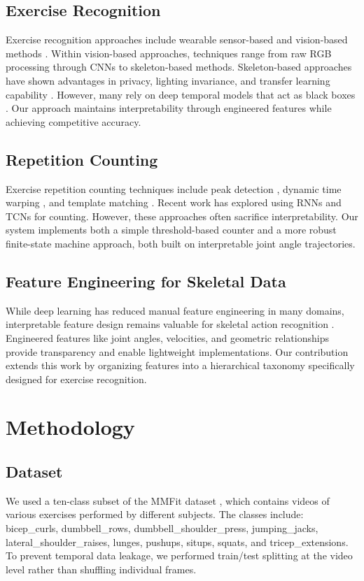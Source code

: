 \documentclass[conference]{IEEEtran}
\begin{document}
\subsection{Exercise Recognition}
Exercise recognition approaches include wearable sensor-based \cite{wearable_rec} and vision-based methods \cite{vision_rec}. Within vision-based approaches, techniques range from raw RGB processing through CNNs to skeleton-based methods. Skeleton-based approaches have shown advantages in privacy, lighting invariance, and transfer learning capability \cite{skel_advantages}. However, many rely on deep temporal models that act as black boxes \cite{temporal_models}. Our approach maintains interpretability through engineered features while achieving competitive accuracy.

\subsection{Repetition Counting}
Exercise repetition counting techniques include peak detection \cite{peak_counting}, dynamic time warping \cite{dtw_counting}, and template matching \cite{template_counting}. Recent work has explored using RNNs \cite{rnn_counting} and TCNs \cite{tcn_counting} for counting. However, these approaches often sacrifice interpretability. Our system implements both a simple threshold-based counter and a more robust finite-state machine approach, both built on interpretable joint angle trajectories.

\subsection{Feature Engineering for Skeletal Data}
While deep learning has reduced manual feature engineering in many domains, interpretable feature design remains valuable for skeletal action recognition \cite{hand_features}. Engineered features like joint angles, velocities, and geometric relationships \cite{geometric_features} provide transparency and enable lightweight implementations. Our contribution extends this work by organizing features into a hierarchical taxonomy specifically designed for exercise recognition.

\section{Methodology}

\subsection{Dataset}
We used a ten-class subset of the MMFit dataset \cite{mmfit}, which contains videos of various exercises performed by different subjects. The classes include: bicep\_curls, dumbbell\_rows, dumbbell\_shoulder\_press, jumping\_jacks, lateral\_shoulder\_raises, lunges, pushups, situps, squats, and tricep\_extensions. To prevent temporal data leakage, we performed train/test splitting at the video level rather than shuffling individual frames.
\end{document}
